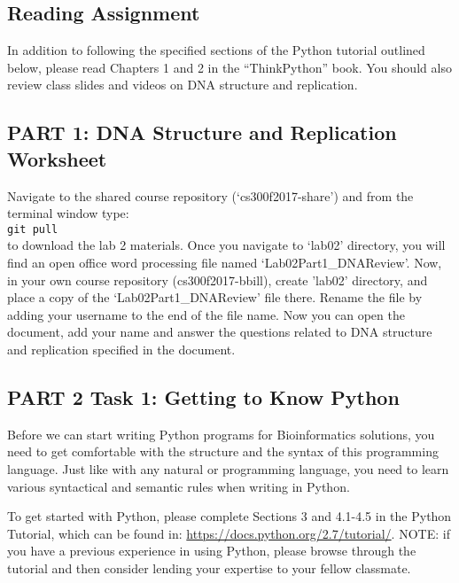 \vspace*{-.1in}
\subsection*{Reading Assignment}
\vspace*{-.1in}
In addition to following the specified sections of the Python tutorial outlined below, please read Chapters 1 and 2 in the ``ThinkPython'' book. You should also review class slides and videos on DNA structure and replication. 

\vspace*{-.1in}
\subsection*{PART 1: DNA Structure and Replication Worksheet}
\vspace*{-.1in} 
Navigate to the shared course repository (`cs300f2017-share') and from the terminal window type: \\
\color{red} {\tt git pull}  \\
\color{black}
to download the lab 2 materials. Once you navigate to `lab02' directory, you will find an open office word processing file named `Lab02Part1\_DNAReview'. Now, in your own course repository (cs300f2017-bbill), create 'lab02' directory, and place a copy of the `Lab02Part1\_DNAReview' file there. Rename the file by adding your username to the end of the file name. Now you can open the document, add your name and answer the questions related to DNA structure and replication specified in the document.

\vspace*{-.1in}
\subsection*{PART 2  Task 1: Getting to Know Python}
\vspace*{-.1in} 

Before we can start writing Python programs for Bioinformatics solutions, you need to get comfortable with the structure and the syntax of this programming language. Just like with any natural or programming language, you need to learn various syntactical and semantic rules when writing in Python. 

\noindent To get started with Python, please complete Sections 3 and 4.1-4.5 in the Python Tutorial, which can be found in: \url{https://docs.python.org/2.7/tutorial/}. NOTE: if you have a previous experience in using Python, please browse through the tutorial and then consider lending your expertise to your fellow classmate.

